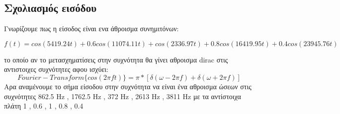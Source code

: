 \documentclass{article}
\begin{document}
{\subsection*{Σχολιασμός εισόδου}
Γνωρίζουμε πως η είσοδος είναι ενα άθροισμα συνημιτόνων:
\begin{changemargin}{-2.5cm}{0cm}\begin{equation*}
\boxed{f(t) = cos(5419.24t) + 0.6 cos(11074.11t) + cos(2336.97t) + 0.8cos(16419.95t) + 0.4cos(23945.76t) }
\end{equation*}
\end{changemargin}
 το οποίο αν το μετασχηματίσεις στην συχνότητα θα γίνει αθροισμα dirac στις αντιστοιχες συχνότητες αφου ισχύει:
\begin{equation*}
\boxed{
Fourier-Transform \{cos(2πft)\} = π * [δ(ω-2πf) + δ(ω+2πf)]}
\end{equation*}
Αρα αναμένουμε το σήμα είσοδου στην συχνότητα να είναι ένα αθροισμα ώσεων στις συχνότητες  862.5 Hz , 1762.5 Hz , 372 Hz , 2613 Hz , 3811 Hz με τα αντίστοιχα πλάτη 1 , 0.6 , 1 , 0.8 , 0.4 
}
\end{document}
